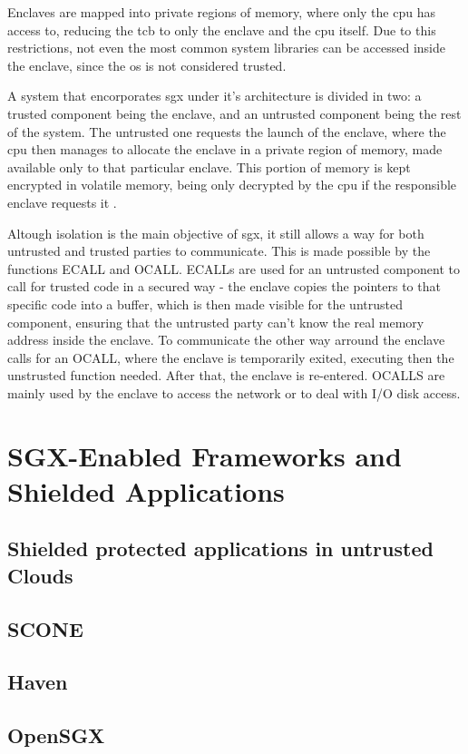 Enclaves are mapped into private regions of memory, where only the \gls{cpu} has access to, reducing the \gls{tcb} to only the enclave and the \gls{cpu} itself. Due to this restrictions, not even the most common system libraries can be accessed inside the enclave, since the \gls{os} is not considered trusted. 

A system that encorporates \gls{sgx} under it's architecture is divided in two: a trusted component being the enclave, and an untrusted component being the rest of the system. The untrusted one requests the launch of the enclave, where the \gls{cpu} then manages to allocate the enclave in a private region of memory, made available only to that particular enclave. This portion of memory is kept encrypted in volatile memory, being only decrypted by the \gls{cpu} if the responsible enclave requests it \cite{guiBorgesThesis}.

Altough isolation is the main objective of \gls{sgx}, it still allows a way for both  untrusted and trusted parties to communicate. This is made possible by the functions ECALL and OCALL. ECALLs are used for an untrusted component to call for trusted code in a secured way - the enclave copies the pointers to that specific code into a buffer, which is then made visible for the untrusted component, ensuring that the untrusted party can't know the real memory address inside the enclave. To communicate the other way arround the enclave calls for an OCALL, where the enclave is temporarily exited, executing then the unstrusted function needed. After that, the enclave is re-entered. OCALLS are mainly used by the enclave to access the network or to deal with I/O disk access.

\section{SGX-Enabled Frameworks and Shielded Applications}
\subsection{Shielded protected applications in untrusted Clouds}
\subsection{SCONE}
\subsection{Haven}
\subsection{OpenSGX}

